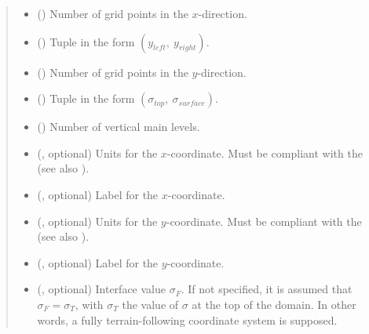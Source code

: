 \documentclass[letterpaper,10pt,english]{sphinxmanual}
\begin{document}
\begin{fulllineitems}
\begin{fulllineitems}
\begin{quote}
\begin{description}
\begin{itemize}
\item {} 
 () \textendash{} Number of grid points in the \(x\)-direction.

\item {} 
 () \textendash{} Tuple in the form \((y_{left}, ~ y_{right})\).

\item {} 
 () \textendash{} Number of grid points in the \(y\)-direction.

\item {} 
 () \textendash{} Tuple in the form \((\sigma_{top}, ~ \sigma_{surface})\).

\item {} 
 () \textendash{} Number of vertical main levels.

\item {} 
 (, optional) \textendash{} 
Units for the \(x\)-coordinate. Must be compliant
with the  (see also
{\hyperref[\detokenize{api:grids.axis.Axis.__init__}]{}}).


\item {} 
 (, optional) \textendash{} Label for the \(x\)-coordinate.

\item {} 
 (, optional) \textendash{} 
Units for the \(y\)-coordinate. Must be compliant
with the  (see also
{\hyperref[\detokenize{api:grids.axis.Axis.__init__}]{}}).


\item {} 
 (, optional) \textendash{} Label for the \(y\)-coordinate.

\item {} 
 (, optional) \textendash{} Interface value \(\sigma_F\). If not specified,
it is assumed that \(\sigma_F = \sigma_T\), with \(\sigma_T\) the value of
\(\sigma\) at the top of the domain. In other words, a fully terrain-following
coordinate system is supposed.


\end{itemize}
\end{description}
\end{quote}
\end{fulllineitems}
\end{fulllineitems}
\end{document}
